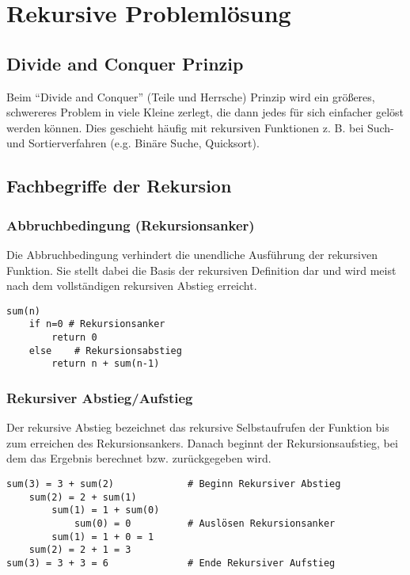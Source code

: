 \section{Rekursive Problemlösung}

\subsection{Divide and Conquer Prinzip}

Beim ``Divide and Conquer'' (Teile und Herrsche) Prinzip wird ein größeres, schwereres Problem
in viele Kleine zerlegt, die dann jedes für sich einfacher gelöst werden können.
Dies geschieht häufig mit rekursiven Funktionen z. B. bei Such- und Sortierverfahren
(e.g. Binäre Suche, Quicksort).

\subsection{Fachbegriffe der Rekursion}

\subsubsection{Abbruchbedingung (Rekursionsanker)}

Die Abbruchbedingung verhindert die unendliche Ausführung der rekursiven Funktion.
Sie stellt dabei die Basis der rekursiven Definition dar und wird meist nach dem vollständigen
rekursiven Abstieg erreicht.

\begin{lstlisting}
sum(n)
    if n=0 # Rekursionsanker
        return 0
    else    # Rekursionsabstieg
        return n + sum(n-1)
\end{lstlisting}

\subsubsection{Rekursiver Abstieg/Aufstieg}
\label{sec:rekursion_ab_auf}

Der rekursive Abstieg bezeichnet das rekursive Selbstaufrufen der Funktion bis zum
erreichen des Rekursionsankers. Danach beginnt der Rekursionsaufstieg, bei dem
das Ergebnis berechnet bzw. zurückgegeben wird.

\begin{lstlisting}
sum(3) = 3 + sum(2)             # Beginn Rekursiver Abstieg
    sum(2) = 2 + sum(1)
        sum(1) = 1 + sum(0)
            sum(0) = 0          # Auslösen Rekursionsanker
        sum(1) = 1 + 0 = 1
    sum(2) = 2 + 1 = 3
sum(3) = 3 + 3 = 6              # Ende Rekursiver Aufstieg
\end{lstlisting}


